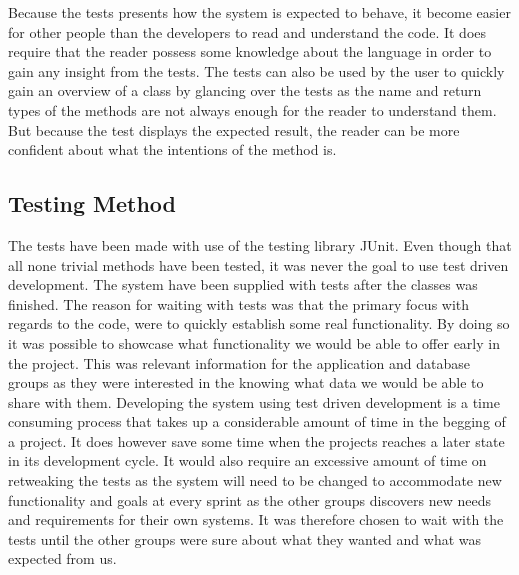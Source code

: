 Because the tests presents how the system is expected to behave, it become easier for other people than the developers to read and understand the code.
It does require that the reader possess some knowledge about the language in order to gain any insight from the tests.
The tests can also be used by the user to quickly gain an overview of a class by glancing over the tests as the name and return types of the methods are not always enough for the reader to understand them.
But because the test displays the expected result, the reader can be more confident about what the intentions of the method is.

\subsection{Testing Method}
The tests have been made with use of the testing library JUnit\cite{junit4}.
Even though that all none trivial methods have been tested, it was never the goal to use test driven development.
The system have been supplied with tests after the classes was finished. 
The reason for waiting with tests was that the primary focus with regards to the code, were to quickly establish some real functionality. 
By doing so it was possible to showcase what functionality we would be able to offer early in the project.%
This was relevant information for the application and database groups as they were interested in the knowing what data we would be able to share with them.
Developing the system using test driven development is a time consuming process that takes up a considerable amount of time in the begging of a project.
It does however save some time when the projects reaches a later state in its development cycle.
It would also require an excessive amount of time on retweaking the tests as the system will need to be changed to accommodate new functionality and goals at every sprint as the other groups discovers new needs and requirements for their own systems.
It was therefore chosen to wait with the tests until the other groups were sure about what they wanted and what was expected from us.